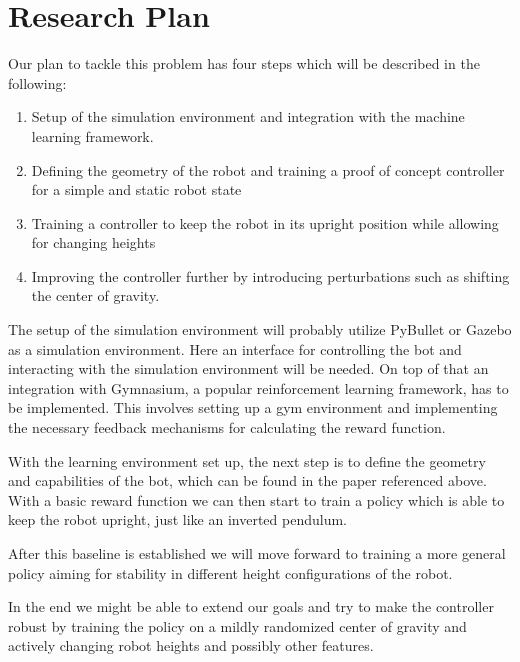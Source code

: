\documentclass[10pt, a4paper]{article}
\begin{document}
\section{Research Plan}
Our plan to tackle this problem has four steps which will be described in the following:
\begin{enumerate}
  \item Setup of the simulation environment and integration with the machine learning framework.
  \item Defining the geometry of the robot and training a proof of concept controller for a simple
        and static robot state
  \item Training a controller to keep the robot in its upright position while allowing for changing heights
  \item Improving the controller further by introducing perturbations such as shifting the center of
        gravity.
\end{enumerate}

The setup of the simulation environment will probably utilize PyBullet or Gazebo as a simulation
environment. Here an interface for controlling the bot and interacting with the simulation environment
will be needed. On top of that an integration with Gymnasium, a popular reinforcement learning
framework, has to be implemented. This involves setting up a gym environment and implementing the necessary
feedback mechanisms for calculating the reward function.

With the learning environment set up, the next step is to define the geometry and capabilities of the
bot, which can be found in the paper referenced above. With a basic reward function we can then start
to train a policy which is able to keep the robot upright, just like an inverted pendulum.

After this baseline is established we will move forward to training a more general policy aiming for
stability in different height configurations of the robot.

In the end we might be able to extend our goals and try to make the controller robust by training
the policy on a mildly randomized center of gravity and actively changing robot heights and possibly
other features.
\end{document}
